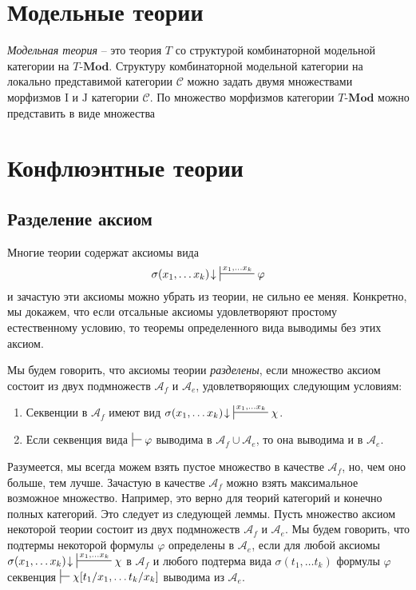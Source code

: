 \documentclass[reqno]{amsart}
\theoremstyle{definition}
\theoremstyle{remark}
\newcommand{\bcat}[1]{\mathbf{#1}}
\newcommand{\cat}[1]{\mathcal{#1}}
\renewcommand{\C}{\cat{C}}
\newcommand{\Mod}[1]{#1\text{-}\bcat{Mod}}
\newcommand{\I}{\mathrm{I}}
\newcommand{\J}{\mathrm{J}}
\begin{document}
\section{Модельные теории}

\emph{Модельная теория} -- это теория $T$ со структурой комбинаторной модельной категории на $\Mod{T}$.
Структуру комбинаторной модельной категории на локально представимой категории $\C$ можно задать двумя множествами морфизмов $\I$ и $\J$ категории $\C$.
По  множество морфизмов категории $\Mod{T}$ можно представить в виде множества 

\section{Конфлюэнтные теории}

\subsection{Разделение аксиом}

Многие теории содержат аксиомы вида
\[ \sigma(x_1, \ldots x_k)\!\downarrow\ \sststile{}{x_1, \ldots x_k} \varphi \]
и зачастую эти аксиомы можно убрать из теории, не сильно ее меняя.
Конкретно, мы докажем, что если отсальные аксиомы удовлетворяют простому естественному условию, то теоремы определенного вида выводимы без этих аксиом.

Мы будем говорить, что аксиомы теории \emph{разделены}, если множество аксиом состоит из двух подмножеств $\mathcal{A}_f$ и $\mathcal{A}_e$, удовлетворяющих следующим условиям:
\begin{enumerate}
\item \label{it:sep-f} Секвенции в $\mathcal{A}_f$ имеют вид $\sigma(x_1, \ldots x_k)\!\downarrow\ \sststile{}{x_1, \ldots x_k} \chi$.
\item \label{it:sep-e} Если секвенция вида $\sststile{}{} \varphi$ выводима в $\mathcal{A}_f \cup \mathcal{A}_e$, то она выводима и в $\mathcal{A}_e$.
\end{enumerate}

Разумеется, мы всегда можем взять пустое множество в качестве $\mathcal{A}_f$, но, чем оно больше, тем лучше.
Зачастую в качестве $\mathcal{A}_f$ можно взять максимальное возможное множество.
Например, это верно для теорий категорий и конечно полных категорий.
Это следует из следующей леммы.
Пусть множество аксиом некоторой теории состоит из двух подмножеств $\mathcal{A}_f$ и $\mathcal{A}_e$.
Мы будем говорить, что подтермы некоторой формулы $\varphi$ определены в $\mathcal{A}_e$, если для любой аксиомы $\sigma(x_1, \ldots x_k)\!\downarrow\ \sststile{}{x_1, \ldots x_k} \chi$ в $\mathcal{A}_f$
и любого подтерма вида $\sigma(t_1, \ldots t_k)$ формулы $\varphi$ секвенция $\sststile{}{} \chi[t_1/x_1, \ldots t_k/x_k]$ выводима из $\mathcal{A}_e$.
\end{document}
